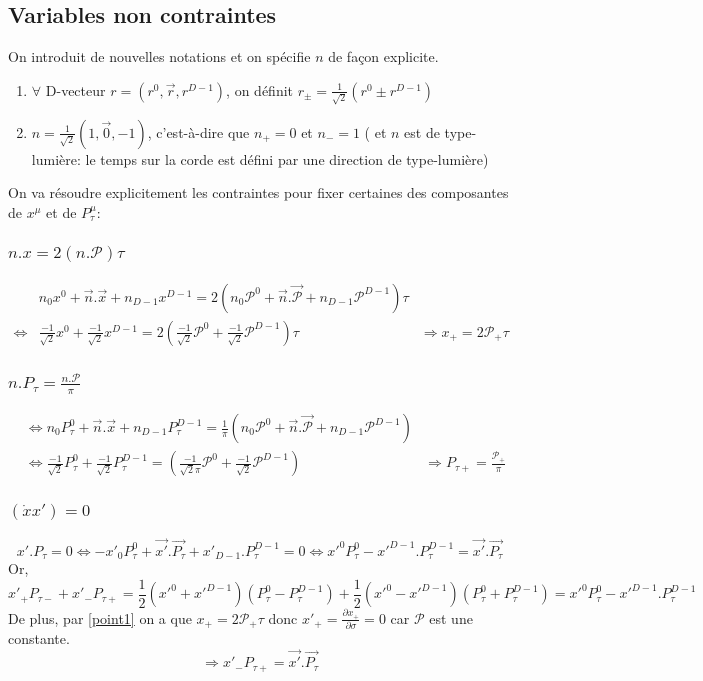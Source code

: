 \documentclass[a4paper,12pt]{article}
\def\xmu{x^\mu}
\begin{document}
\subsection{Variables non contraintes}
On introduit de nouvelles notations et on spécifie $n$ de façon explicite.
\begin{enumerate}
\item $\forall$ D-vecteur $r=(r^0,\vec{r},r^{D-1})$, on définit
$r_\pm=\frac{1}{\sqrt2}(r^0\pm r^{D-1})$
\item $n=\frac{1}{\sqrt2}(1,\vec{0},-1)$, c'est-à-dire que 
$n_+=0$ et $n_-=1$ ( et $n$ est de type-lumière: le temps sur la corde est défini par une direction de type-lumière)
\end{enumerate}
On va résoudre explicitement les contraintes pour fixer certaines des composantes de $\xmu$ et de $P_\tau^\mu$: 
\subsubsection{$n.x=2(n.\mathcal{P})\tau$}\label{point1}
\begin{align*}
& n_0x^0 + \vec{n}.\vec{x} + n_{D-1}x^{D-1}=2\left( n_0\mathcal{P}^0 + \vec{n}.\vec{\mathcal{P}} + n_{D-1}\mathcal{P}^{D-1}\right) \tau\\
\Leftrightarrow &\frac{-1}{\sqrt{2}}x^0 + \frac{-1}{\sqrt{2}}x^{D-1}=2\left( \frac{-1}{\sqrt{2}}\mathcal{P}^0  + \frac{-1}{\sqrt{2}}\mathcal{P}^{D-1}\right) \tau &\Rightarrow\boxed{x_+ = 2 \mathcal{P_+}\tau}
\end{align*}
\subsubsection{$n.P_\tau=\frac{n.\mathcal{P}}{\pi}$}
\begin{align*}
&\Leftrightarrow n_0P_\tau^0 + \vec{n}.\vec{x} + n_{D-1}P_\tau^{D-1}=\frac{1}{\pi}\left( n_0\mathcal{P}^0 + \vec{n}.\vec{\mathcal{P}} + n_{D-1}\mathcal{P}^{D-1}\right)\\
&\Leftrightarrow \frac{-1}{\sqrt{2}}P_\tau^0 + \frac{-1}{\sqrt{2}}P_\tau^{D-1}=\left( \frac{-1}{\sqrt{2}\pi}\mathcal{P}^0  + \frac{-1}{\sqrt{2}}\mathcal{P}^{D-1}\right)
&\Rightarrow\boxed{P_{\tau+} = \frac{\mathcal{P_+}}{\pi}}
\end{align*}
\subsubsection{$(\dot{x}x')=0$}
\begin{equation*}
 x'.P_\tau=0
\Leftrightarrow -x'_0P_\tau^0 +\vec{x'}.\vec{P_\tau} + x'_{D-1}.P_\tau^{D-1} =0
\Leftrightarrow x'^0P_\tau^0 - x'^{D-1}.P_\tau^{D-1}=\vec{x'}.\vec{P_\tau}
\end{equation*}
Or,
\begin{equation*}
x'_+P_{\tau -} + x'_-P_{\tau +}=\frac{1}{2}\left( x'^0 + x'^{D-1}\right) \left(P_\tau^0 - P_\tau^{D-1}\right) + \frac{1}{2}\left( x'^0 - x'^{D-1}\right) \left(P_\tau^0 + P_\tau^{D-1}\right)=x'^0P_\tau^0 - x'^{D-1}.P_\tau^{D-1}
\end{equation*}
De plus, par \eqref{point1} on a que $x_+ = 2 \mathcal{P_+}\tau$ donc $x'_+=\frac{\partial x_+}{\partial \sigma}=0$ car $\mathcal{P}$ est une constante.
$$\Rightarrow\boxed{x'_-P_{\tau +}=\vec{x'}.\vec{P_\tau}}$$
\end{document}
